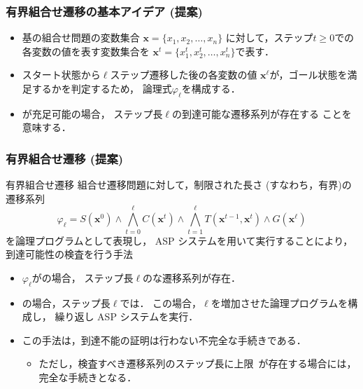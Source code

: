 \documentclass[dvipdfmx,11pt]{beamer}
\begin{document}
\begin{frame}
  \frametitle{有界組合せ遷移の基本アイデア (提案)}
  \begin{itemize}
  \item 基の組合せ問題の変数集合
    $\bm{x} = \{x_1,x_2,\ldots,x_n\}$
    に対して，ステップ$t\geq 0$での各変数の値を表す変数集合を
    $\bm{x}^{t} = \{x_1^t,x_2^t,\ldots,x_n^t\}$で表す．
  \item スタート状態から$\ell$ステップ遷移した後の各変数の値
    $\bm{x}^{\ell}$が，ゴール状態を満足するかを判定するため，
    論理式$\varphi_{\ell}$を構成する．
  \end{itemize}
  \begin{itemize}
  \item \bm{$\varphi_{\ell}$}が充足可能の場合，
    ステップ長$\ell$の到達可能な遷移系列が存在する
    ことを意味する．
  \end{itemize}
\end{frame}
\begin{frame}%
  \frametitle{有界組合せ遷移 (提案)} 
  \begin{alertblock}{有界組合せ遷移}\centering
    組合せ遷移問題に対して，制限された長さ (すなわち，有界)の
    遷移系列
    \[
    \varphi_{\ell} = S(\bm{x}^0)  
    \land \bigwedge_{t=0}^{\ell} C(\bm{x}^t) 
    \land \bigwedge_{t=1}^{\ell} T(\bm{x}^{t-1},\bm{x}^{t}) 
    \land G(\bm{x}^\ell)  
    \]
    を論理プログラムとして表現し，
    ASP システムを用いて実行することにより，到達可能性の検査を行う手法
  \end{alertblock}
  \begin{itemize}
  \item $\varphi_{\ell}$がの場合，
    ステップ長$\ell$のな遷移系列が存在．
  \item {}の場合，ステップ長$\ell$では．
    この場合，$\ell$を増加させた論理プログラムを構成し，
    繰り返し ASP システムを実行．
  \item この手法は，到達不能の証明は行わない不完全な手続きである．
    \begin{itemize}
      \item ただし，検査すべき遷移系列のステップ長に上限~\footnotemark[2]
        が存在する場合には，完全な手続きとなる．
    \end{itemize}
  \end{itemize}
\end{frame}
\end{document}

